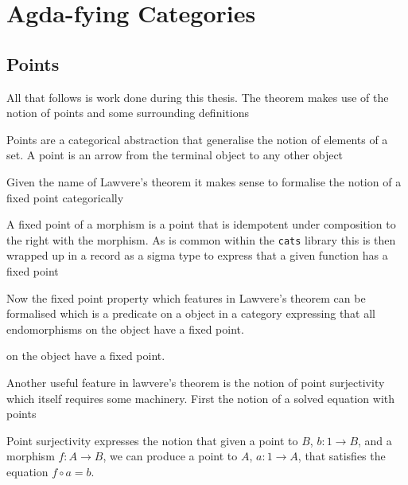 \section{Agda-fying Categories}

\subsection{Points} 
All that follows is work done during this thesis. The theorem makes use of the
notion of points and some surrounding definitions

Points are a categorical abstraction that generalise the notion of elements of
a set. A point is an arrow from the terminal object to any other object


Given the name of Lawvere's theorem it makes sense to formalise the notion of a
fixed point categorically


A fixed point of a morphism is a point that is idempotent under composition to
the right with the morphism. As is common within the \verb|cats| library this is
then wrapped up in a record as a sigma type to express that a given function has
a fixed point


Now the fixed point property which features in Lawvere's theorem can be
formalised which is a predicate on a object in a category expressing that all
endomorphisms on the object have a fixed point.

 on the object have a fixed point.

Another useful feature in lawvere's theorem is the notion of point surjectivity
which itself requires some machinery. First the notion of a solved equation with
points


Point surjectivity expresses the notion that given a point to $B$, $b : 1
\rightarrow B$, and a morphism $f : A \rightarrow B$, we can produce a point to
$A$, $a : 1 \rightarrow A$, that satisfies the equation $f \circ a = b$.

